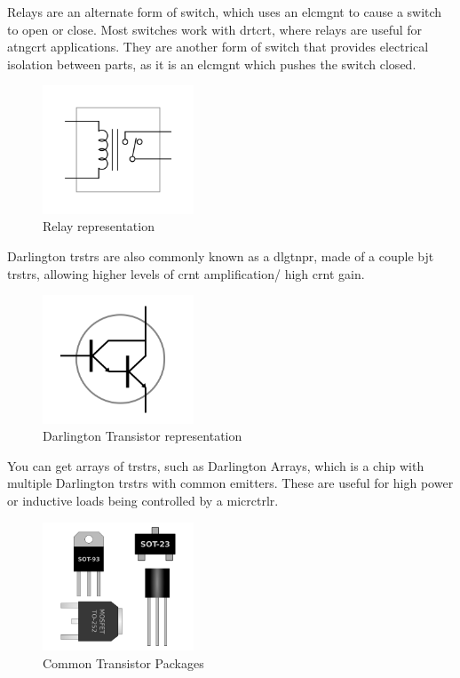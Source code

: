 \documentclass[a4paper,11pt]{report}
\begin{document}
Relays are an alternate form of switch, which uses an \gls{elcmgnt} to cause a switch to open or close. Most switches work with \gls{drtcrt}, where relays are useful for \gls{atngcrt} applications. They are another form of switch that provides electrical isolation between parts, as it is an \gls{elcmgnt} which pushes the switch closed.

\begin{figure}[H]
\centering
\includegraphics[width=0.4\textwidth]{relay}
\caption{Relay representation}
\end{figure}

Darlington \gls{trstr}s are also commonly known as a \gls{dlgtnpr}, made of a couple \gls{bjt} \gls{trstr}s, allowing higher levels of \gls{crnt} amplification/ high \gls{crnt} gain.

\begin{figure}[H]
\centering
\includegraphics[width=0.4\textwidth]{darlingtontransistor}
\caption{Darlington Transistor representation}
\end{figure}

You can get arrays of \gls{trstr}s, such as Darlington Arrays, which is a chip with multiple Darlington \gls{trstr}s with common emitters. These are useful for high power or inductive loads being controlled by a \gls{micrctrlr}.

\begin{figure}[H]
\centering
\includegraphics[width=0.4\textwidth]{transistorpackages}
\caption{Common Transistor Packages}
\end{figure}
\end{document}
